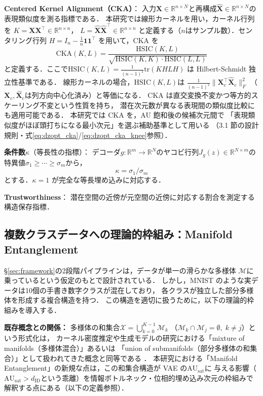 \documentclass[12pt,a4paper]{jsarticle}
\newcommand{\dID}{d_{\mathrm{ID}}}
\newcommand{\Jg}{J_g}
\newcommand{\R}{\mathbb{R}}
\newcommand{\kap}{\kappa}
\newcommand{\AUsat}{\mathrm{AU}_{\mathrm{sat}}}
\begin{document}
\textbf{Centered Kernel Alignment（CKA）}\cite{kornblith2019cka}：
入力$\boldsymbol{X} \in \R^{n \times N}$と再構成$\hat{\boldsymbol{X}} \in \R^{n \times N}$の
表現類似度を測る指標である．
本研究では線形カーネルを用い，カーネル行列を
$K = \boldsymbol{X}\boldsymbol{X}^\top \in \R^{n \times n}$，
$L = \hat{\boldsymbol{X}}\hat{\boldsymbol{X}}^\top \in \R^{n \times n}$
と定義する（$n$はサンプル数）．センタリング行列
$H = I_n - \frac{1}{n}\boldsymbol{1}\boldsymbol{1}^\top$
を用いて，CKA を
\begin{equation}
  \mathrm{CKA}(K, L)
  = \frac{\mathrm{HSIC}(K, L)}{\sqrt{\mathrm{HSIC}(K,K)\cdot\mathrm{HSIC}(L,L)}}
  \label{eq:cka}
\end{equation}
と定義する．ここで$\mathrm{HSIC}(K, L) = \frac{1}{(n-1)^2}\mathrm{tr}(KHLH)$
は Hilbert-Schmidt 独立性基準である．
線形カーネルの場合，$\mathrm{HSIC}(K,L)$は
$\frac{1}{(n-1)^2}\|\boldsymbol{X}_c^\top \hat{\boldsymbol{X}}_c\|_F^2$
（$\boldsymbol{X}_c, \hat{\boldsymbol{X}}_c$は列方向中心化済み）と等価になる．
CKA は直交変換不変かつ等方的スケーリング不変という性質を持ち，
潜在次元数が異なる表現間の類似度比較にも適用可能である．
本研究では CKA を，AU 飽和後の候補次元間で
「表現類似度がほぼ頭打ちになる最小次元」を選ぶ補助基準として用いる
（3.1 節の設計規則・式\eqref{eq:dzopt_cka}/\eqref{eq:dzopt_cka_knee}参照）．

\textbf{条件数$\kap$}（等長性の指標）：
デコーダ$g:\R^m\to\R^N$のヤコビ行列$\Jg(z) \in \R^{N\times m}$の
特異値$\sigma_1 \geq \cdots \geq \sigma_m$から，
\begin{equation}
  \kap = \sigma_1/\sigma_m
\end{equation}
とする．$\kap = 1$ が完全な等長埋め込みに対応する．

\textbf{Trustworthiness}：
潜在空間の近傍が元空間の近傍に対応する割合を測定する構造保存指標\cite{pope2021intrinsic}．

\subsection{複数クラスデータへの理論的枠組み：Manifold Entanglement}\label{sec:manifold_entanglement}

§\ref{sec:framework}の2段階パイプラインは，データが単一の滑らかな多様体
$\mathcal{M}$に乗っているという仮定のもとで設計されている．
しかし，MNIST のような実データは10個の手書き数字クラスが混在しており，
各クラスが独立した部分多様体を形成する複合構造を持つ．
この構造を適切に扱うために，以下の理論的枠組みを導入する．

\textbf{既存概念との関係：}
多様体の和集合$\mathcal{X} = \bigcup_{k=0}^{K-1}\mathcal{M}_k$
（$\mathcal{M}_k \cap \mathcal{M}_j = \emptyset,\; k \neq j$）という形式化は，
カーネル密度推定や生成モデルの研究における「mixture of manifolds（多様体混合）」あるいは
「union of submanifolds（部分多様体の和集合）」として扱われてきた概念と同等である
\cite{pope2021intrinsic,carlsson2009topology}．
本研究における「Manifold Entanglement」の新規な点は，この和集合構造が VAE の$\AUsat$に
与える影響（$\AUsat > \dID$という乖離）を情報ボトルネック・位相的埋め込み次元の枠組みで
解釈する点にある（以下の定義参照）．
\end{document}
